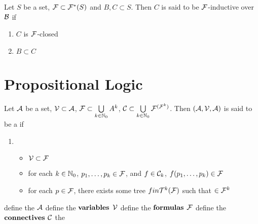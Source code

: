 \documentclass{book}
\begin{document}
	\begin{defn}
		Let $S$ be a set, $\mathcal{F} \subset \mathcal{F}^*(S)$ and $B, C \subset S$. Then $C$ is said to be $\mathcal{F}$-inductive over $\mathcal{B}$ if 
		\begin{enumerate}
			\item $C$ is $\mathcal{F}$-closed
			\item $B \subset C$
		\end{enumerate}
	\end{defn}
	
	
	\chapter{Propositional Logic}
	\begin{defn} 
		Let $\mathcal{A}$ be a set, $\mathcal{V} \subset \mathcal{A}$, $\mathcal{F} \subset \bigcup\limits_{k \in \mathbb{N}_0} A^k$, $\mathcal{C} \subset \bigcup\limits_{k \in \mathbb{N}_0} \mathcal{F}^{(\mathcal{F}^k)}$. Then $(\mathcal{A}, \mathcal{V}, \mathcal{A})$ is said to be a  
		if 
		\begin{enumerate}
			\item 
			\begin{itemize}
				\item $\mathcal{V} \subset \mathcal{F}$
				\item for each $k \in \mathbb{N}_0$, $p_1, \ldots, p_k \in \mathcal{F}$, and $f \in \mathcal{C}_k$, $f(p_1, \ldots, p_k) \in \mathcal{F}$
				\item for each $p \in \mathcal{F}$, there exists some tree $f in \mathcal{T}^k(\mathcal{F})$ such that $ \in \mathcal{F}^{k}$ 
			\end{itemize}
		\end{enumerate}
		define the  $\mathcal{A}$
		define the $\textbf{variables}$ $\mathcal{V}$
		define the $\textbf{formulas}$ $\mathcal{F}$
		define the $\textbf{connectives}$ $\mathcal{C}$
		the 
	\end{defn}

	\begin{ex}
		
	\end{ex}
	
	
	
	
	
	
\end{document}
